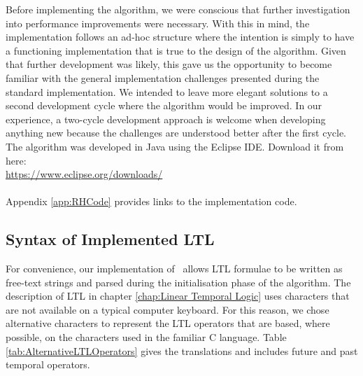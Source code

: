 Before implementing the algorithm, we were conscious that further investigation into performance improvements were necessary.  With this in mind, the implementation follows an ad-hoc structure where the intention is simply to have a functioning implementation that is true to the design of the algorithm.  Given that further development was likely, this gave us the opportunity to become familiar with the general implementation challenges presented during the standard implementation.  We intended to leave more elegant solutions to a second development cycle where the algorithm would be improved.  In our experience, a two-cycle development approach is welcome when developing anything new because the challenges are understood better after the first cycle.\\

\noindent The algorithm was developed in Java using the Eclipse IDE.  Download it from here:\\
\indent \url{https://www.eclipse.org/downloads/}\\
\\
Appendix \ref{app:RHCode} provides links to the implementation code. 

\subsection{Syntax of Implemented LTL}

For convenience, our implementation of \RH\ allows LTL formulae to be written as free-text strings and parsed during the initialisation phase of the algorithm.  The description of LTL in chapter \ref{chap:Linear Temporal Logic} uses characters that are not available on a typical computer keyboard.  For this reason, we chose alternative characters to represent the LTL operators that are based, where possible, on the characters used in the familiar C language.  Table \ref{tab:AlternativeLTLOperators} gives the translations and includes future and past temporal operators.

